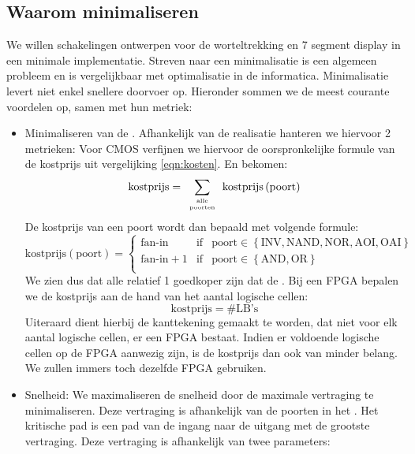 \subsection{Waarom minimaliseren}
We willen schakelingen ontwerpen voor de worteltrekking en 7 segment display in een minimale implementatie. Streven naar een minimalisatie is een algemeen probleem en is vergelijkbaar met optimalisatie in de informatica. Minimalisatie levert niet enkel snellere doorvoer op. Hieronder sommen we de meest courante voordelen op, samen met hun metriek:
\begin{itemize}
\item Minimaliseren van de . Afhankelijk van de realisatie hanteren we hiervoor 2 metrieken: Voor CMOS verfijnen we hiervoor de oorspronkelijke formule van de kostprijs uit vergelijking \ref{eqn:kosten}. En bekomen:
\begin{equation}
\mbox{kostprijs}=\displaystyle\sum_{\tiny\begin{array}{c}\mbox{alle}\\\mbox{poorten}\end{array}}{\mbox{kostprijs}\left(\mbox{poort}\right)}
\label{eqn:kostenCmos}
\end{equation}
De kostprijs van een poort wordt dan bepaald met volgende formule:
\begin{equation}
\mbox{kostprijs}\left(\mbox{poort}\right)=\left\{\begin{array}{lcl}
\mbox{fan-in}&\mbox{if}&\mbox{poort}\in\left\{\mbox{INV},\mbox{NAND},\mbox{NOR},\mbox{AOI},\mbox{OAI}\right\}\\
\mbox{fan-in}+1&\mbox{if}&\mbox{poort}\in\left\{\mbox{AND},\mbox{OR}\right\}\\
\end{array}\right.
\label{eqn:kostenCmosPoort}
\end{equation}
We zien dus dat alle  relatief 1 goedkoper zijn dat de . Bij een FPGA bepalen we de kostprijs aan de hand van het aantal logische cellen:
\begin{equation}
\mbox{kostprijs}=\#\mbox{LB's}
\end{equation}
Uiteraard dient hierbij de kanttekening gemaakt te worden, dat niet voor elk aantal logische cellen, er een FPGA bestaat. Indien er voldoende logische cellen op de FPGA aanwezig zijn, is de kostprijs dan ook van minder belang. We zullen immers toch dezelfde FPGA gebruiken.
\item Snelheid: We maximaliseren de snelheid door de maximale vertraging te minimaliseren. Deze vertraging is afhankelijk van de poorten in het . Het kritische pad is een pad van de ingang naar de uitgang met de grootste vertraging. Deze vertraging is afhankelijk van twee parameters:

\end{itemize}
